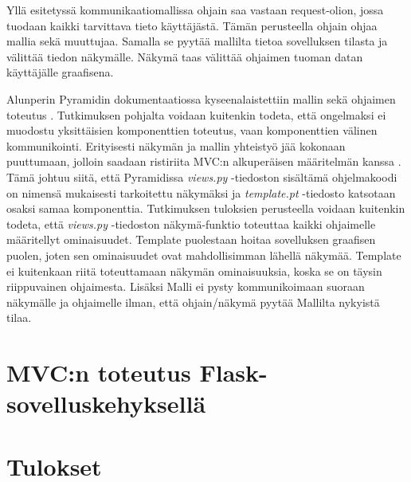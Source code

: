 \documentclass[utf8]{gradu3}
\begin{document}
Yllä esitetyssä kommunikaatiomallissa ohjain saa vastaan request-olion, jossa tuodaan kaikki tarvittava tieto käyttäjästä. Tämän perusteella ohjain ohjaa mallia
sekä muuttujaa. Samalla se pyytää mallilta tietoa sovelluksen tilasta ja välittää tiedon näkymälle. Näkymä taas välittää ohjaimen tuoman datan käyttäjälle graafisena.


Alunperin Pyramidin dokumentaatiossa kyseenalaistettiin mallin sekä ohjaimen toteutus \cite{Pyramid:intr}. Tutkimuksen pohjalta voidaan kuitenkin
todeta, että ongelmaksi ei muodostu yksittäisien komponenttien toteutus, vaan komponenttien välinen kommunikointi. Erityisesti näkymän ja mallin yhteistyö jää
kokonaan puuttumaan, jolloin saadaan ristiriita MVC:n alkuperäisen määritelmän kanssa \cite[s. 1]{reenskaug_orig}. Tämä johtuu siitä, että Pyramidissa \emph{views.py} -tiedoston sisältämä ohjelmakoodi on nimensä mukaisesti tarkoitettu näkymäksi ja
\emph{template.pt} -tiedosto katsotaan osaksi samaa komponenttia. Tutkimuksen tuloksien perusteella voidaan kuitenkin todeta, että \emph{views.py} -tiedoston näkymä-funktio toteuttaa kaikki
ohjaimelle määritellyt ominaisuudet. Template puolestaan hoitaa sovelluksen graafisen puolen, joten sen ominaisuudet ovat mahdollisimman lähellä näkymää. Template ei kuitenkaan riitä toteuttamaan näkymän ominaisuuksia, koska se on täysin riippuvainen ohjaimesta. Lisäksi Malli ei pysty kommunikoimaan suoraan näkymälle ja ohjaimelle ilman, että ohjain/näkymä pyytää Mallilta nykyistä tilaa.


\chapter{MVC:n toteutus Flask-sovelluskehyksellä}

\chapter{Tulokset}
\printbibliography
\appendix
\end{document}
